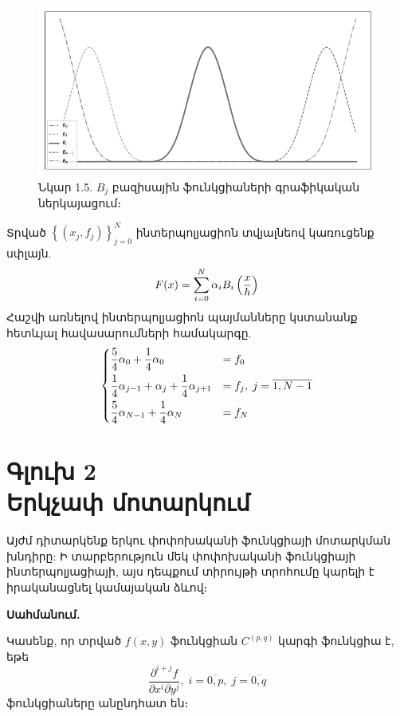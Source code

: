 \documentclass[fleqn, bachelor,subf,12pt,notitlepage]{article}
\begin{document}
\begin{figure}[H]
\centering
\includegraphics[width=1.0\textwidth]{images/all_cubic_compact_support_basis}
\captionsetup{labelformat=empty}
\caption{Նկար 1.5. $B_{j}$ բազիսային ֆունկցիաների գրաֆիկական ներկայացում։}
\end{figure}
Տրված $\left\{\left(x_{j}, f_{j}\right)\right\}_{j=0}^{N}$ ինտերպոլյացիոն տվյալնեով կառուցենք սփլայն.
\begin{equation}
F(x) = \sum_{i=0}^{N} \alpha_{i}B_{i}\left(\frac{x}{h}\right)$$
\end{equation}
Հաշվի առնելով ինտերպոլյացիոն պայմանները կստանանք հետևյալ հավասարումների համակարգը.
\begin{equation}
\begin{dcases}
\frac{5}{4}\alpha_{0} + \frac{1}{4}\alpha_{0} &= f_{0}\\
\frac{1}{4}\alpha_{j-1} + \alpha_{j} + \frac{1}{4}\alpha_{j+1} &= f_{j}, \; j=\overline{1, N-1}\\
\frac{5}{4}\alpha_{N-1} + \frac{1}{4}\alpha_{N} &= f_{N}\\
\end{dcases}
\end{equation}
\newpage
\section*{\centering Գլուխ 2 \\ Երկչափ մոտարկում}
\setcounter{equation}{0}
Այժմ դիտարկենք երկու փոփոխականի ֆունկցիայի մոտարկման խնդիրը: Ի տարբերություն մեկ փոփոխականի ֆունկցիայի ինտերպոլյացիայի, այս դեպքում տիրույթի տրոհումը կարելի է իրականացնել կամայական ձևով։

\vspace{1.5mm}
\noindent \textbf{Սահմանում.}

\noindent Կասենք, որ տրված $f\left(x, y\right)$ ֆունկցիան  $C^{\left(p, q\right)}$ կարգի ֆունկցիա է, եթե 
\begin{equation*}
\dfrac{\partial^{i+j} f}{\partial x^{i} \partial y^{j}}, \; i = \overline{0, p} , \; j = \overline{0, q}
\end{equation*}
ֆունկցիաները անընդհատ են։
\end{document}
